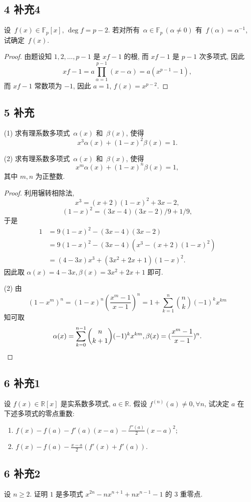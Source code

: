 \documentclass[12pt,a4paper,reqno]{amsart}
\theoremstyle{remark}
\newcommand{\F}{\mathbb{F}}
\newcommand{\R}{\mathbb{R}}
\renewcommand{\ge}{\geqslant}
\begin{document}
\subsection*{4 补充4}
设\ $f(x)\in\F_p[x],\, \deg f=p-2$. 若对所有\ $\alpha\in\F_p\,(\alpha\neq 0)$ 有\ $f(\alpha)=\alpha^{-1}$, 试确定\ $f(x)$.
\begin{proof}
由题设知 $1,2,\ldots,p-1$ 是 $xf-1$ 的根, 而 $xf-1$ 是 $p-1$ 次多项式, 因此
  \[ xf-1=a \prod_{\alpha=1}^{p-1}(x-\alpha)=a(x^{p-1}-1),\]
而 $xf-1$ 常数项为 $-1$, 因此 $a=1$, $f(x)=x^{p-2}$.
\end{proof}

\subsection*{5 补充}
(1) 求有理系数多项式\ $\alpha(x)$ 和\ $\beta(x)$, 使得
  \[x^3\alpha(x)+(1-x)^2\beta(x)=1.\]

(2) 求有理系数多项式\ $\alpha(x)$ 和\ $\beta(x)$, 使得
  \[x^m\alpha(x)+(1-x)^n\beta(x)=1,\]
其中 $m,n$ 为正整数.

\begin{proof}
利用辗转相除法,
  \[x^3=(x+2)(1-x)^2+3x-2,\]
  \[(1-x)^2=(3x-4)(3x-2)/9+1/9,\]
于是
  \[\begin{split}
  1&=9(1-x)^2-(3x-4)(3x-2)\\
  &=9(1-x)^2-(3x-4)(x^3-(x+2)(1-x)^2)\\
  &=(4-3x)x^3+(3x^2+2x+1)(1-x)^2.\end{split}\]
因此取 $\alpha(x)=4-3x,\beta(x)=3x^2+2x+1$ 即可.

(2) 由
  \[(1-x^m)^n=(1-x)^n(\frac{x^m-1}{x-1})^n=1+\sum_{k=1}^{n}{n\choose k}(-1)^{k}x^{km}\]
知可取
  \[\alpha(x)=\sum_{k=0}^{n-1}{n\choose k+1}(-1)^kx^{km},\beta(x)=(\frac{x^m-1}{x-1})^n.\qedhere\]
\end{proof}

\subsection*{6 补充1}
设 $f(x)\in\R[x]$ 是实系数多项式, $a\in\R$. 假设 $f^{(n)}(a)\neq 0,\forall n$, 试决定 $a$ 在下述多项式的零点重数:
\begin{enumerate}
  \item $f(x)-f(a)-f'(a)(x-a)-\frac{f''(a)}{2}(x-a)^2;$
  \item $f(x)-f(a)-\frac{x-a}{2}(f'(x)+f'(a)).$
\end{enumerate}

\subsection*{6 补充2}
设 $n\ge 2$. 证明 $1$ 是多项式 $x^{2n}-nx^{n+1}+nx^{n-1}-1$ 的 $3$ 重零点.
\end{document}
